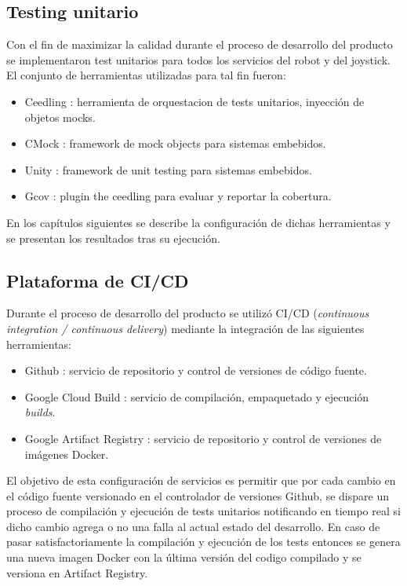

\subsection{Testing unitario}
Con el fin de maximizar la calidad durante el proceso de desarrollo del producto se implementaron test unitarios para todos los servicios del robot y del joystick. El conjunto de herramientas utilizadas para tal fin fueron:
\begin{itemize}
	\item Ceedling \cite{SoftwareTool_Ceedling}: herramienta de orquestacion de tests unitarios, inyección de objetos mocks.
	\item CMock \cite{SoftwareTool_CMock}: framework de mock objects para sistemas embebidos.
	\item Unity \cite{SoftwareTool_Unity}: framework de unit testing para sistemas embebidos.
	\item Gcov \cite{SoftwareTool_CeedlingGCov}: plugin the ceedling para evaluar y reportar la cobertura.
\end{itemize}

En los capítulos siguientes se describe la configuración de dichas herramientas y se presentan los resultados tras su ejecución.

\subsection{Plataforma de CI/CD}
Durante el proceso de desarrollo del producto se utilizó CI/CD (\textit{continuous integration / continuous delivery}) mediante la integración de las siguientes herramientas:

\begin{itemize}
	\item Github \cite{SoftwareTool_Github}: servicio de repositorio y control de versiones de código fuente.
	\item Google Cloud Build \cite{SoftwareTool_CloudBuild}: servicio de compilación, empaquetado y ejecución \textit{builds}.
	\item Google Artifact Registry \cite{SoftwareTool_ArtifactRegistry}: servicio de repositorio y control de versiones de imágenes Docker.
\end{itemize}

El objetivo de esta configuración de servicios es permitir que por cada cambio en el código fuente versionado en el controlador de versiones Github, se dispare un proceso de compilación y ejecución de tests unitarios notificando en tiempo real si dicho cambio agrega o no una falla al actual estado del desarrollo. En caso de pasar satisfactoriamente la compilación y ejecución de los tests entonces se genera una nueva imagen Docker con la última versión del codigo compilado y se versiona en Artifact Registry.

